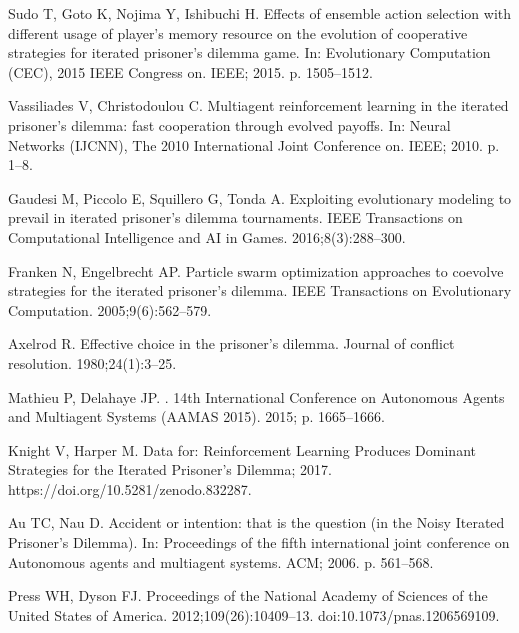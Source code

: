 \documentclass[10pt,letterpaper]{article}
\begin{document}
\begin{thebibliography}{10}
Sudo T, Goto K, Nojima Y, Ishibuchi H.
\newblock Effects of ensemble action selection with different usage of player's
  memory resource on the evolution of cooperative strategies for iterated
  prisoner's dilemma game.
\newblock In: Evolutionary Computation (CEC), 2015 IEEE Congress on. IEEE;
  2015. p. 1505--1512.

Vassiliades V, Christodoulou C.
\newblock Multiagent reinforcement learning in the iterated prisoner's dilemma:
  fast cooperation through evolved payoffs.
\newblock In: Neural Networks (IJCNN), The 2010 International Joint Conference
  on. IEEE; 2010. p. 1--8.

Gaudesi M, Piccolo E, Squillero G, Tonda A.
\newblock Exploiting evolutionary modeling to prevail in iterated prisoner’s
  dilemma tournaments.
\newblock IEEE Transactions on Computational Intelligence and AI in Games.
  2016;8(3):288--300.

Franken N, Engelbrecht AP.
\newblock Particle swarm optimization approaches to coevolve strategies for the
  iterated prisoner's dilemma.
\newblock IEEE Transactions on Evolutionary Computation. 2005;9(6):562--579.

Axelrod R.
\newblock Effective choice in the prisoner's dilemma.
\newblock Journal of conflict resolution. 1980;24(1):3--25.

Mathieu P, Delahaye JP.
.
\newblock 14th International Conference on Autonomous Agents and Multiagent
  Systems (AAMAS 2015). 2015; p. 1665--1666.

Knight V, Harper M. {Data for: Reinforcement Learning Produces Dominant
  Strategies for the Iterated Prisoner's Dilemma}; 2017.
\newblock https://doi.org/10.5281/zenodo.832287.

Au TC, Nau D.
\newblock Accident or intention: that is the question (in the Noisy Iterated
  Prisoner's Dilemma).
\newblock In: Proceedings of the fifth international joint conference on
  Autonomous agents and multiagent systems. ACM; 2006. p. 561--568.

Press WH, Dyson FJ.
\newblock Proceedings of the National Academy of Sciences of the United States
  of America. 2012;109(26):10409--13.
\newblock doi:{10.1073/pnas.1206569109}.


\end{thebibliography}
\end{document}

